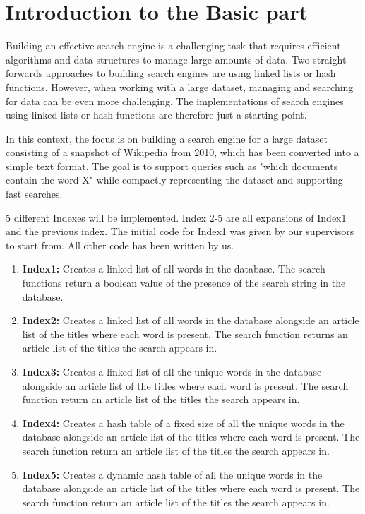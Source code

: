 \section{Introduction to the Basic part}
Building an effective search engine is a challenging task that requires efficient algorithms and data structures to manage large amounts of data. Two straight forwards approaches to building search engines are using linked lists or hash functions. However, when working with a large dataset, managing and searching for data can be even more challenging. The implementations of search engines using linked lists or hash functions are therefore just a starting point.

In this context, the focus is on building a search engine for a large dataset consisting of a snapshot of Wikipedia from 2010, which has been converted into a simple text format. The goal is to support queries such as "which documents contain the word X" while compactly representing the dataset and supporting fast searches.

5 different Indexes will be implemented. Index 2-5 are all expansions of Index1 and the previous index. The initial code for Index1 was given by our supervisors to start from. All other code has been written by us. 

\begin{enumerate}
    \item[] \textbf{Index1:} Creates a linked list of all words in the database. The search functions return a boolean value of the presence of the search string in the database.
    \item[] \textbf{Index2:} Creates a linked list of all words in the database alongside an article list of the titles where each word is present. The search function returns an article list of the titles the search appears in. 
    \item[] \textbf{Index3:} Creates a linked list of all the unique words in the database alongside an article list of the titles where each word is present. The search function return an article list of the titles the search appears in.
    \item[] \textbf{Index4:} Creates a hash table of a fixed size of all the unique words in the database alongside an article list of the titles where each word is present. The search function return an article list of the titles the search appears in.
    \item[] \textbf{Index5:} Creates a dynamic hash table of all the unique words in the database alongside an article list of the titles where each word is present. The search function return an article list of the titles the search appears in.
\end{enumerate}




